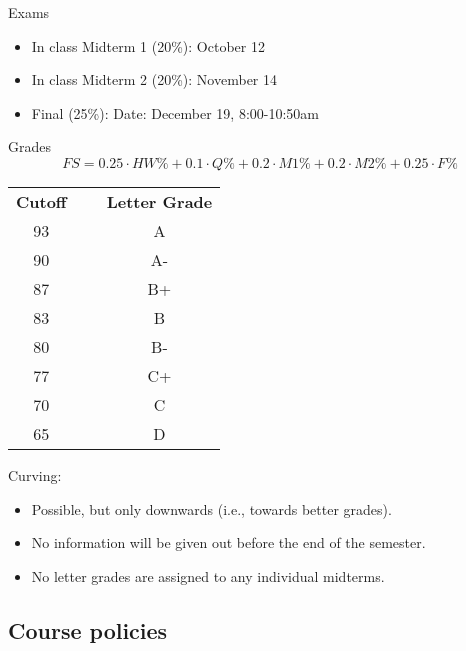 \documentclass{beamer}
\begin{document}
\begin{frame}{Exams}
\begin{itemize}
\item In class Midterm 1 (20\%): October 12 \pause
\item In class Midterm 2 (20\%): November 14 \pause
\item Final (25\%): Date: December 19, 8:00-10:50am 
\end{itemize}
\end{frame}

\begin{frame}{Grades}
\vspace{-0.5cm}
\[
FS=0.25\cdot HW\%+0.1\cdot Q\%+0.2\cdot M1\%+0.2\cdot M2\%+0.25\cdot F\%
\]
\begin{center}
\begin{tabular}{c c c}
\textbf{Cutoff}&~&\textbf{Letter Grade}\\
93 & ~ &	A\\
90 &~&	A-\\
87 &~&	B+\\
83 &~&	B\\
80 &~&	B-\\
77 &~&	C+\\
70 &~&	C\\
65 &~&	D\\
\end{tabular}
\end{center}\pause
Curving:
\begin{itemize}
\item Possible, but only downwards (i.e., towards better grades).\pause
\item No information will be given out before the end of the semester.\pause
\item No letter grades are assigned to any individual midterms.
\end{itemize}
\end{frame}

\subsection{Course policies}
\end{document}
